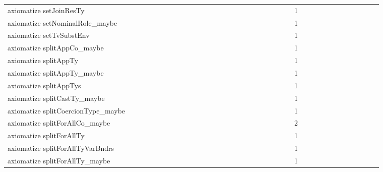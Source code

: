 {\begin{tabular}{l|rrr|rrr|rrr}
axiomatize setJoinResTy &  &  &  &  &  &  &  &  &  &  &  &  &  &  &  &  &  &  &  &  &  &  &  & 1 &  &  &  &  &  &  &  &  &  &  &  & \\
axiomatize setNominalRole_maybe &  &  &  &  &  &  &  &  &  &  &  &  &  &  &  &  &  &  &  &  &  &  &  & 1 &  &  &  &  &  &  &  &  &  &  &  & \\
axiomatize setTvSubstEnv &  &  &  &  &  &  &  &  &  &  &  &  &  &  &  &  &  &  &  &  &  &  &  & 1 &  &  &  &  &  &  &  &  &  &  &  & \\
axiomatize splitAppCo_maybe &  &  &  &  &  &  &  &  &  &  &  &  &  &  &  &  &  &  &  &  &  &  &  & 1 &  &  &  &  &  &  &  &  &  &  &  & \\
axiomatize splitAppTy &  &  &  &  &  &  &  &  &  &  &  &  &  &  &  &  &  &  &  &  &  &  &  & 1 &  &  &  &  &  &  &  &  &  &  &  & \\
axiomatize splitAppTy_maybe &  &  &  &  &  &  &  &  &  &  &  &  &  &  &  &  &  &  &  &  &  &  &  & 1 &  &  &  &  &  &  &  &  &  &  &  & \\
axiomatize splitAppTys &  &  &  &  &  &  &  &  &  &  &  &  &  &  &  &  &  &  &  &  &  &  &  & 1 &  &  &  &  &  &  &  &  &  &  &  & \\
axiomatize splitCastTy_maybe &  &  &  &  &  &  &  &  &  &  &  &  &  &  &  &  &  &  &  &  &  &  &  & 1 &  &  &  &  &  &  &  &  &  &  &  & \\
axiomatize splitCoercionType_maybe &  &  &  &  &  &  &  &  &  &  &  &  &  &  &  &  &  &  &  &  &  &  &  & 1 &  &  &  &  &  &  &  &  &  &  &  & \\
axiomatize splitForAllCo_maybe &  &  &  &  &  &  &  &  &  &  &  &  &  &  &  &  &  &  &  &  &  &  &  & 2 &  &  &  &  &  &  &  &  &  &  &  & \\
axiomatize splitForAllTy &  &  &  &  &  &  &  &  &  &  &  &  &  &  &  &  &  &  &  &  &  &  &  & 1 &  &  &  &  &  &  &  &  &  &  &  & \\
axiomatize splitForAllTyVarBndrs &  &  &  &  &  &  &  &  &  &  &  &  &  &  &  &  &  &  &  &  &  &  &  & 1 &  &  &  &  &  &  &  &  &  &  &  & \\
axiomatize splitForAllTy_maybe &  &  &  &  &  &  &  &  &  &  &  &  &  &  &  &  &  &  &  &  &  &  &  & 1 &  &  &  &  &  &  &  &  &  &  &  & \\

\end{tabular}}
